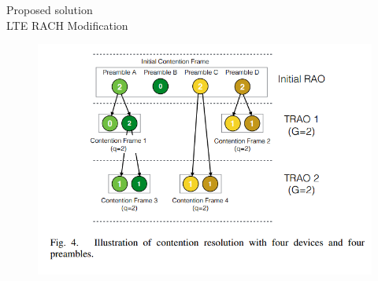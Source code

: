 \documentclass{beamer}
\begin{document}
\begin{frame}{{Proposed solution}\\LTE RACH Modification}
    \begin{figure}[t]
        \centering
        \includegraphics[width=1.1\textwidth]{figures/d.png}
    \end{figure}
\end{frame}
\end{document}
